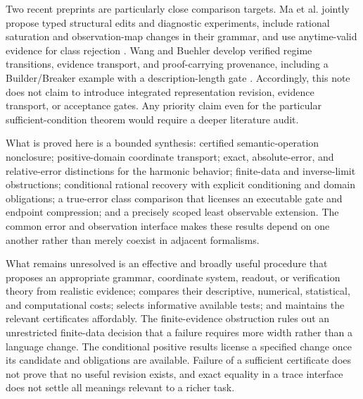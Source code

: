\documentclass[11pt]{article}
\theoremstyle{definition}
\begin{document}
Two recent preprints are particularly close comparison targets.
Ma et al. jointly propose typed structural edits and diagnostic experiments,
include rational saturation and observation-map changes in their grammar,
and use anytime-valid evidence for class rejection \cite{lr:ma2026}.
Wang and Buehler develop verified regime transitions, evidence transport,
and proof-carrying provenance, including a Builder/Breaker example with a
description-length gate \cite{lr:wang2026}. Accordingly, this note does
not claim to introduce integrated representation revision, evidence
transport, or acceptance gates. Any priority claim even for the particular
sufficient-condition theorem would require a deeper literature audit.

What is proved here is a bounded synthesis: certified semantic-operation
nonclosure; positive-domain coordinate transport; exact, absolute-error,
and relative-error distinctions for the harmonic behavior; finite-data and
inverse-limit obstructions; conditional rational recovery with explicit
conditioning and domain obligations; a true-error class comparison that
licenses an executable gate and endpoint compression; and a precisely
scoped least observable extension. The common error and observation
interface makes these results depend on one another rather than merely
coexist in adjacent formalisms.

What remains unresolved is an effective and broadly useful procedure that
proposes an appropriate grammar, coordinate system, readout, or verification
theory from realistic evidence; compares their descriptive, numerical,
statistical, and computational costs; selects informative available tests;
and maintains the relevant certificates affordably. The finite-evidence
obstruction rules out an unrestricted finite-data decision that a failure
requires more width rather than a language change. The conditional positive
results license a specified change once its candidate and obligations are
available. Failure of a sufficient certificate does not prove that no useful
revision exists, and exact equality in a trace interface does not settle
all meanings relevant to a richer task.
\end{document}
